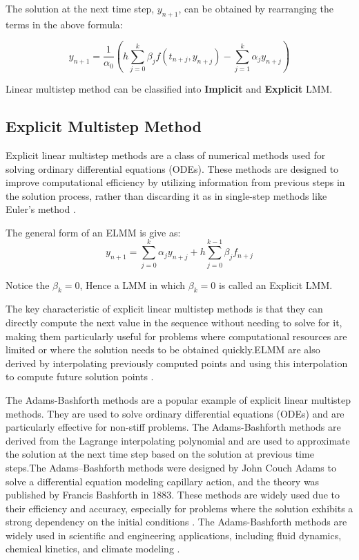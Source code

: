 The solution at the next time step, \(y_{n+1}\), can be obtained by rearranging the terms in the above formula:

\[
y_{n+1} = \frac{1}{\alpha_0} \left(h \sum_{j=0}^{k} \beta_j f(t_{n+j}, y_{n+j}) - \sum_{j=1}^{k} \alpha_j y_{n+j}\right)
\]


Linear multistep method can be classified into \textbf{Implicit} and \textbf{Explicit} LMM.


\subsection{Explicit Multistep Method}
Explicit linear multistep methods are a class of numerical methods used for solving ordinary differential equations (ODEs). These methods are designed to improve computational efficiency by utilizing information from previous steps in the solution process, rather than discarding it as in single-step methods like Euler's method \cite{enwiki:1182900519}.

The general form of an ELMM is give as:
\[y_{n+1} = \sum_{j=0}^{k} \alpha_j y_{n+j} + h \sum_{j=0}^{k-1} \beta_j f_{n+j}
\]

Notice the $\beta_k = 0$, Hence a LMM in which $\beta_k = 0$ is called an Explicit LMM.

The key characteristic of explicit linear multistep methods is that they can directly compute the next value in the sequence without needing to solve for it, making them particularly useful for problems where computational resources are limited or where the solution needs to be obtained quickly.ELMM are also derived by  interpolating previously computed points and using this interpolation to compute future solution points \cite{Alexanderian2022}.

The Adams-Bashforth methods are a popular example of explicit linear multistep methods. They are used to solve ordinary differential equations (ODEs) and are particularly effective for non-stiff problems. The Adams-Bashforth methods are derived from the Lagrange interpolating polynomial and are used to approximate the solution at the next time step based on the solution at previous time steps.The Adams–Bashforth methods were designed by John Couch Adams to solve a differential equation modeling capillary action, and the theory was published by Francis Bashforth in 1883. These methods are widely used due to their efficiency and accuracy, especially for problems where the solution exhibits a strong dependency on the initial conditions \cite{enwiki:1166346639}. The Adams-Bashforth methods are widely used in scientific and engineering applications, including fluid dynamics, chemical kinetics, and climate modeling \cite{wong2020lecture}.

